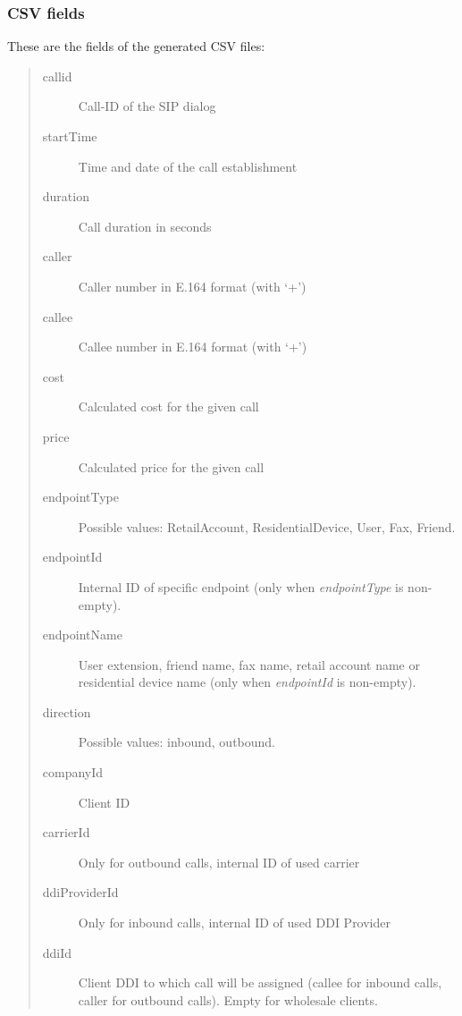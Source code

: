\documentclass[letterpaper,10pt,english]{sphinxmanual}
\begin{document}
\subsubsection{CSV fields}
\label{administration_portal/brand/calls/call_csv_schedulers:csv-fields}
These are the fields of the generated CSV files:
\begin{quote}
\begin{description}
\item[{callid}] \leavevmode
Call-ID of the SIP dialog

\item[{startTime}] \leavevmode
Time and date of the call establishment

\item[{duration}] \leavevmode
Call duration in seconds

\item[{caller}] \leavevmode
Caller number in E.164 format (with `+')

\item[{callee}] \leavevmode
Callee number in E.164 format (with `+')

\item[{cost}] \leavevmode
Calculated cost for the given call

\item[{price}] \leavevmode
Calculated price for the given call

\item[{endpointType}] \leavevmode
Possible values: RetailAccount, ResidentialDevice, User, Fax, Friend.

\item[{endpointId}] \leavevmode
Internal ID of specific endpoint (only when \emph{endpointType} is non-empty).

\item[{endpointName}] \leavevmode
User extension, friend name, fax name, retail account name or residential device name (only when \emph{endpointId} is non-empty).

\item[{direction}] \leavevmode
Possible values: inbound, outbound.

\item[{companyId}] \leavevmode
Client ID

\item[{carrierId}] \leavevmode
Only for outbound calls, internal ID of used carrier

\item[{ddiProviderId}] \leavevmode
Only for inbound calls, internal ID of used DDI Provider

\item[{ddiId}] \leavevmode
Client DDI to which call will be assigned (callee for inbound calls, caller for outbound calls). Empty for
wholesale clients.

\end{description}
\end{quote}
\end{document}

